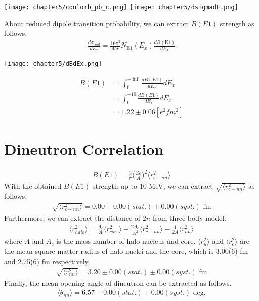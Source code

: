 \begin{center}
    \texttt{[image: chapter5/coulomb\_pb\_c.png]}    
    \texttt{[image: chapter5/dsigmadE.png]}    
\end{center}    

About reduced dipole transition probability, we can extract $B(E1)$ strength as follows.
\begin{align}
    \frac{d \sigma_{coul}}{dE_x} = \frac{16 \pi^{3} }{9 \hbar c} N_{\text{E1}}(E_x) \frac{dB(\text{E1})}{dE_x}
\end{align}

\begin{center}
    \texttt{[image: chapter5/dBdEx.png]}    
\end{center}  
\begin{align}
    B(E1) &= \int_{0}^{+\inf} \frac{dB(E1)}{dE_x} dE_x \\
          &= \int_{0}^{+10} \frac{dB(E1)}{dE_x} dE_x \\ 
          &= 1.22 \pm 0.06  [e^{2}fm^{2}]    
\end{align}  

\section{Dineutron Correlation}

\begin{align}
    B(E1) = \frac{3}{\pi} \bigg( \frac{Ze}{A} \bigg)^2 \langle r^{2}_{c-nn} \rangle
\end{align}
With the obtained $B(E1)$ strength up to 10 MeV, we can extract $\sqrt{ \langle r^{2}_{c-nn} \rangle}$ as follows.
\begin{align}
    \sqrt{ \langle r^{2}_{c-nn} \rangle} = 0.00 \pm 0.00 (stat.) \pm 0.00 (syst.) \text{ fm}
\end{align}
Furthermore, we can extract the distance of $2n$ from three body model.
\begin{align}
    \langle r^{2}_{halo} \rangle = \frac{A_c}{A} \langle r^{2}_{core} \rangle + \frac{2A_c}{A^2} \langle r^{2}_{c-nn} \rangle - \frac{1}{2A} \langle r^{2}_{nn} \rangle
\end{align}
where $A$ and $A_c$ is the mass number of halo nucleus and core. $\langle r^{2}_{h} \rangle$ and $\langle r^{2}_{c} \rangle$ are the mean-square matter radius of halo nuclei and the core, which is 3.00(6) fm and 2.75(6) fm respectively.
\begin{align}
    \sqrt{ \langle r^{2}_{nn} \rangle} = 3.20 \pm 0.00 (stat.) \pm 0.00 (syst.) \text{ fm}
\end{align}
Finally, the mean opening angle of dineutron can be extracted as follows.
\begin{align}
    \langle \theta_{nn} \rangle = 6.57 \pm 0.00 (stat.) \pm 0.00 (syst.) \text{ deg.}
\end{align}
